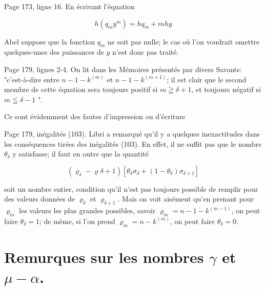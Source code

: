 \documentclass{article}
\begin{document}
Page 173, ligne 16. En écrivant l'équation

\[
h\left(q_{m} y^{m}\right)=h q_{m}+m h y
\]

Abel suppose que la fonction \(q_{m}\) ne soit pas nulle; le cas où l'on voudrait omettre quelques-unes des puissances de \(y\) n'est donc pas traité.

Page 179, lignes 2-4. On lit dans les Mémoires présentés par divers Savants: "c'est-à-dire entre \(n-1-k^{(m)}\) et \(n-1-k^{(m+1)}\); il est clair que le second membre de cette équation sera toujours positif si \(m \geqq \delta+1\), et toujours négatif si \(m \leqq \delta-1\) ".

Ce sont évidemment des fautes d'impression ou d'écriture

Page 179, inégalités (103). Libri a remarqué qu'il y a quelques inexactitudes dans les conséquences tirées des inégalités (103). En effet, il ne suffit pas que le nombre \(\theta_{\delta}\) y satisfasse; il faut en outre que la quantité

\[
\left(\varrho_{\delta}-\varrho \delta+1\right)\left[\theta_{\delta} \sigma_{\delta}+\left(1-\theta_{\delta}\right) \sigma_{\delta+1}\right]
\]

soit un nombre entier, condition qu'il n'est pas toujours possible de remplir pour des valeurs données de \(\varrho_{\delta}\) et \(\varrho_{\delta+1}\). Mais on voit aisément qu'en prenant pour \(\varrho_{m}\) les valeurs les plus grandes possibles, savoir \(\varrho_{m}=n-1-k^{(m-1)}\), on peut faire \(\theta_{\delta}=1\); de même, si l'on prend \(\varrho_{m}=n-k^{(m)}\), on peut faire \(\theta_{\delta}=0\).

\section*{Remurques sur les nombres \(\gamma\) et \(\mu-\alpha\).}
\end{document}
